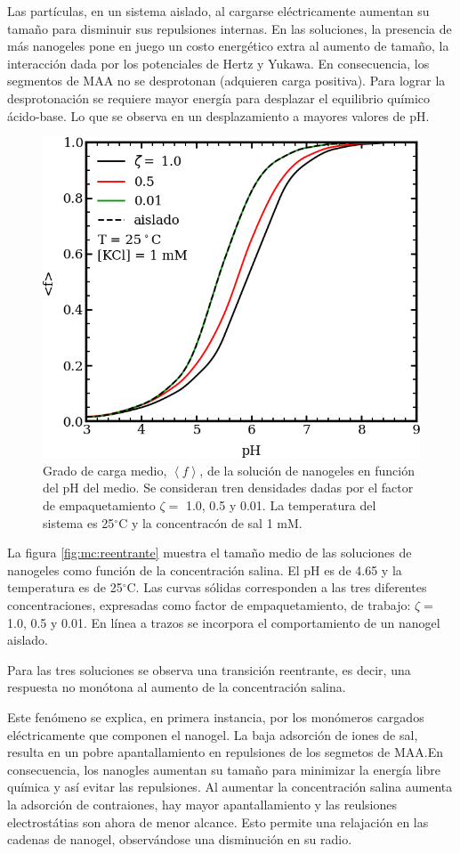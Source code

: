 	Las part\'iculas, en un sistema aislado, al cargarse el\'ectricamente aumentan su tama\~no para disminuir sus repulsiones internas. En las soluciones, la presencia de m\'as nanogeles pone en juego un costo energ\'etico extra al aumento de tama\~no, la interacci\'on dada por los potenciales de Hertz y Yukawa. En consecuencia, los segmentos de MAA no se desprotonan (adquieren carga positiva). Para lograr la desprotonaci\'on se requiere mayor energ\'ia para desplazar el equilibrio qu\'imico \'acido-base. Lo que se observa en un desplazamiento a mayores valores de pH.
	
	\begin{figure}
		\centering
		\includegraphics[width=0.45\linewidth]{Figures/graph-mc/fvspH.png}
		\caption{Grado de carga medio, $\left<f\right>$, de la soluci\'on de nanogeles en funci\'on del pH del medio. Se consideran tren densidades dadas por el factor de empaquetamiento $\zeta =$ 1.0, 0.5 y 0.01. La temperatura del sistema es 25$^\circ$C y la concentrac\'on de sal 1 mM.}
		\label{fig:mc:fvspH}
	\end{figure}
	
	
	La figura \ref{fig:mc:reentrante} muestra el tama\~no medio de las soluciones de nanogeles como funci\'on de la concentraci\'on salina. El pH es de 4.65 y la temperatura es de 25$^\circ$C. Las curvas s\'olidas corresponden a las tres diferentes concentraciones, expresadas como factor de empaquetamiento, de trabajo: $\zeta =$ 1.0, 0.5 y 0.01. En l\'inea a trazos se incorpora el comportamiento de un nanogel aislado.
	
	Para las tres soluciones se observa una transici\'on reentrante, es decir, una respuesta no mon\'otona al aumento de la concentraci\'on salina.
	
	Este fen\'omeno se explica, en primera instancia, por los mon\'omeros cargados el\'ectricamente que componen el nanogel. La baja adsorci\'on de iones de sal, resulta en un pobre apantallamiento en repulsiones de los segmetos de MAA.En consecuencia, los nanogles aumentan su tama\~no para minimizar la energ\'ia libre qu\'imica y as\'i evitar las repulsiones. Al aumentar la concentraci\'on salina aumenta la adsorci\'on de contraiones, hay mayor apantallamiento y las reulsiones electrost\'atias son ahora de menor alcance. Esto permite una relajaci\'on en las cadenas de nanogel, observ\'andose una disminuci\'on en su radio.
	
